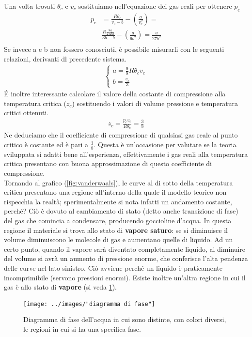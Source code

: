 \documentclass[
10pt, %
a4paper, %
oneside, %
headinclude,footinclude, %
BCOR5mm, %
]{scrartcl}
\begin{document}
Una volta trovati $\theta_c$ e $v_c$ sostituiamo nell'equazione dei gas reali per ottenere $p_c$
\begin{align*} 
	p_c &= \frac{R \theta_c}{v_c - b}-  \left(\frac{a}{v_c^2}\right) = \\
	&\frac{R \frac{8a}{27 R b}}{3b - b}-  \left(\frac{a}{9b^2}\right) = \frac{a}{27 b^2}\\
\end{align*} 
Se invece a e b non fossero conosciuti, è possibile misurarli con le seguenti relazioni, derivanti dl precedente sistema. 
\begin{align*} 
	\begin{cases}
		a = \frac{9}{8} R \theta_c v_c\\
		b = \frac{v_c}{3}
	\end{cases}
\end{align*} 
\'{E} inoltre interessante calcolare il valore della costante di compressione alla temperatura critica ($z_c$) sostituendo i valori di volume pressione e temperatura critici ottenuti. 
\begin{align*} 
	z_c = \frac{p_c v_c }{R \theta_c} = \frac{3}{8}
\end{align*} 
Ne deduciamo che il coefficiente di compressione di qualsiasi gas reale al punto critico è costante ed è pari a $\frac{3}{8}$. Questa è un'occasione per valutare se la teoria sviluppata si adatti bene all'esperienza, effettivamente i gas reali alla temperatura critica presentano con buona approssimazione di questo coefficiente di compressione.\\
Tornando al grafico (\ref{fig:vanderwaals}), le curve al di sotto della temperatura critica presentano una regione all'interno della quale il modello teorico non rispecchia la realtà; sperimentalmente si nota infatti un andamento costante, perché? Ciò è dovuto al cambiamento di stato (detto anche transizione di fase) del gas che comincia a condensare, producendo goccioline d'acqua. In questa regione il materiale si trova allo stato di \textbf{vapore saturo}: se si diminuisce il volume diminuiscono le molecole di gas e aumentano quelle di liquido. Ad un certo punto, quando il vapore sarà diventato completamente liquido, al diminuire del volume si avrà un aumento di pressione enorme, che conferisce l'alta pendenza delle curve nel lato sinistro. Ciò avviene perché un liquido è praticamente incomprimibile (servono pressioni enormi). Esiste inoltre un'altra regione in cui il gas è allo stato di \textbf{vapore} (si veda \ref{fig:diagramma-di-fase}). 
\begin{figure}[h!]
	\centering
	\texttt{[image: ../images/"diagramma di fase"]}
	\caption{Diagramma di fase dell'acqua in cui sono distinte, con colori diversi, le regioni in cui si ha una specifica fase.}
	\label{fig:diagramma-di-fase}
\end{figure}
\end{document}
